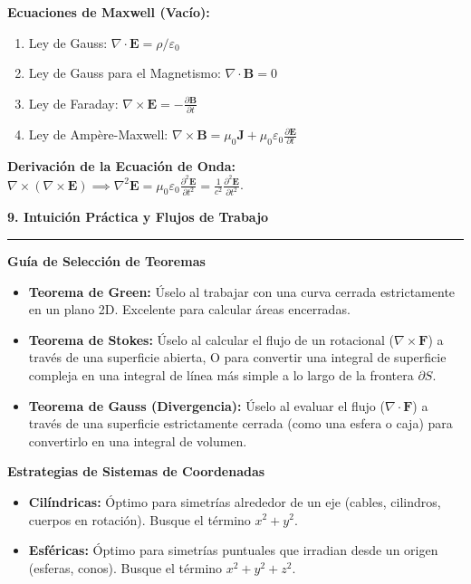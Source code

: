 \documentclass[10pt, landscape, twocolumn]{article}
\newcommand{\cheatsheetsection}[1]{
    \vspace{0.8em}
    {\color{themeblue}\large\bfseries #1} \par
    \vspace{-0.4em}
    {\color{themeblue}\rule{\linewidth}{1pt}} \par
    \vspace{0.3em}
}
\newcommand{\cheatsheetsubsection}[1]{
    \vspace{0.5em}
    {\color{themeblue}\normalsize\bfseries #1} \par
    \vspace{0.2em}
}
\begin{document}
\textbf{Ecuaciones de Maxwell (Vacío):}
\begin{enumerate}[label=\arabic*., leftmargin=*, nosep]
    \item Ley de Gauss: $\nabla \cdot \mathbf{E} = \rho / \varepsilon_0$
    \item Ley de Gauss para el Magnetismo: $\nabla \cdot \mathbf{B} = 0$
    \item Ley de Faraday: $\nabla \times \mathbf{E} = -\frac{\partial \mathbf{B}}{\partial t}$
    \item Ley de Ampère-Maxwell: $\nabla \times \mathbf{B} = \mu_0 \mathbf{J} + \mu_0 \varepsilon_0 \frac{\partial \mathbf{E}}{\partial t}$
\end{enumerate}
\textbf{Derivación de la Ecuación de Onda:} $\nabla \times (\nabla \times \mathbf{E}) \implies \nabla^2 \mathbf{E} = \mu_0 \varepsilon_0 \frac{\partial^2 \mathbf{E}}{\partial t^2} = \frac{1}{c^2} \frac{\partial^2 \mathbf{E}}{\partial t^2}$.

\cheatsheetsection{9. Intuición Práctica y Flujos de Trabajo}

\cheatsheetsubsection{Guía de Selección de Teoremas}
\begin{itemize}[leftmargin=*, nosep]
    \item \textbf{Teorema de Green:} Úselo al trabajar con una curva cerrada estrictamente en un plano 2D. Excelente para calcular áreas encerradas.
    \item \textbf{Teorema de Stokes:} Úselo al calcular el flujo de un rotacional ($\nabla \times \mathbf{F}$) a través de una superficie abierta, O para convertir una integral de superficie compleja en una integral de línea más simple a lo largo de la frontera $\partial S$.
    \item \textbf{Teorema de Gauss (Divergencia):} Úselo al evaluar el flujo ($\nabla \cdot \mathbf{F}$) a través de una superficie estrictamente cerrada (como una esfera o caja) para convertirlo en una integral de volumen.
\end{itemize}

\newpage
\cheatsheetsubsection{Estrategias de Sistemas de Coordenadas}
\begin{itemize}[leftmargin=*, nosep]
    \item \textbf{Cilíndricas:} Óptimo para simetrías alrededor de un eje (cables, cilindros, cuerpos en rotación). Busque el término $x^2 + y^2$.
    \item \textbf{Esféricas:} Óptimo para simetrías puntuales que irradian desde un origen (esferas, conos). Busque el término $x^2 + y^2 + z^2$.
\end{itemize}
\end{document}
